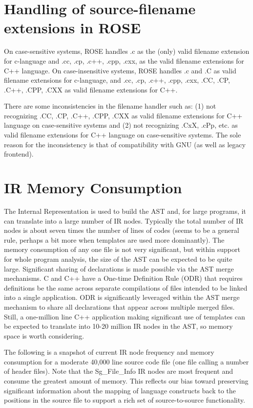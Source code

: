 \section{Handling of source-filename extensions in ROSE}
    On case-sensitive systems, ROSE handles .c as the (only) valid filename extension
for c-language and .cc, .cp, .c++, .cpp, .cxx, as the valid filename extensions for
C++ language. On case-insensitive systems, ROSE handles .c and .C as valid filename
extensions for c-language, and .cc, .cp, .c++, .cpp, .cxx, .CC,
.CP, .C++, .CPP, .CXX as valid filename extensions for C++.

There are some inconsistencies in the filename handler such as: (1) not recognizing
.CC, .CP, .C++, .CPP, .CXX as valid filename extensions for C++ language on case-sensitive
systems and  (2) not recognizing .CxX, .cPp, etc. as valid filename extensions for
C++ language on case-sensitive systems. The sole reason for the inconsistency is that
of compatibility with GNU (as well as legacy frontend).


\section{IR Memory Consumption}
    The Internal Representation is used to build the AST and, for large programs,
it can translate into a large number of IR nodes.  Typically the total number of 
IR nodes is about seven times the number of lines of codes (seems to be a general 
rule, perhaps a bit more when templates are used more dominantly).  The memory
consumption of any one file is not very significant, but within support for whole
program analysis, the size of the AST can be expected to be quite large.  Significant
sharing of declarations is made possible via the AST merge mechanisms.  C and C++
have a One-time Definition Rule (ODR) that requires definitions be the same
across separate compilations of files intended to be linked into a single application.
ODR is significantly leveraged within the AST merge mechanism to share all declarations
that appear across multiple merged files.  Still, a one-million line C++ application 
making significant use of templates can be expected to translate into 10-20 million 
IR nodes in the AST, so memory space is worth considering.

   The following is a snapshot of current IR node frequency and memory consumption for
a moderate 40,000 line source code file (one file calling a number of header files).
Note that the Sg\_File\_Info IR nodes are most frequent and consume the greatest amount 
of memory. This reflects our bias toward preserving significant information about the
mapping of language constructs back to the positions in the source file to support
a rich set of source-to-source functionality.

